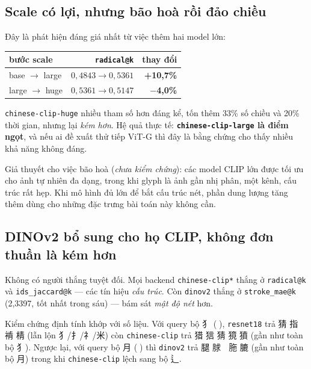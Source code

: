 \documentclass[11pt,a4paper]{article}
\newcommand{\nom}[1]{{\nomfont #1}}
\newcommand{\nomb}[1]{{\nomfontb #1}}
\newcommand{\code}[1]{\texttt{#1}}
\begin{document}
\subsection{Scale có lợi, nhưng bão hoà rồi đảo chiều}

Đây là phát hiện đáng giá nhất từ việc thêm hai model lớn:

\begin{center}
\begin{tabular}{lrr}
\toprule
bước scale & \code{radical@k} & thay đổi \\
\midrule
base $\to$ large & $0{,}4843 \to 0{,}5361$ & \textbf{+10,7\%} \\
large $\to$ huge & $0{,}5361 \to 0{,}5147$ & \textbf{$-$4,0\%} \\
\bottomrule
\end{tabular}
\end{center}

\code{chinese-clip-huge} nhiều tham số hơn đáng kể, tốn thêm 33\% số chiều và 20\% thời gian,
nhưng lại \emph{kém hơn}. Hệ quả thực tế: \textbf{\code{chinese-clip-large} là điểm ngọt}, và nếu
ai đề xuất thử tiếp ViT-G thì đây là bằng chứng cho thấy nhiều khả năng không đáng.

Giả thuyết cho việc bão hoà (\emph{chưa kiểm chứng}): các model CLIP lớn được tối ưu cho ảnh tự
nhiên đa dạng, trong khi glyph là ảnh gần nhị phân, một kênh, cấu trúc rất hẹp. Khi mô hình đủ lớn
để bắt cấu trúc nét, phần dung lượng tăng thêm dùng cho những đặc trưng bài toán này không cần.

\subsection{DINOv2 bổ sung cho họ CLIP, không đơn thuần là kém hơn}

Không có người thắng tuyệt đối. Mọi backend \code{chinese-clip*} thắng ở \code{radical@k} và
\code{ids\_jaccard@k} --- các tín hiệu \emph{cấu trúc}. Còn \code{dinov2} thắng ở
\code{stroke\_mae@k} (2,3397, tốt nhất trong sáu) --- bám sát \emph{mật độ nét} hơn.

Kiểm chứng định tính khớp với số liệu. Với query bộ \nom{犭} (\nomb{𤟂}), \code{resnet18} trả
\nom{猜 指 𢯡 褃 棈} (lẫn lộn \nom{犭/扌/礻/米}) còn \code{chinese-clip} trả \nom{猎 狺 猜 獍 獖}
(gần như toàn bộ \nom{犭}). Ngược lại, với query bộ \nom{月} (\nomb{𦝊}) thì \code{dinov2} trả
\nom{腿 脙}\nomb{ 𦟂 }\nom{胣 膔} (gần như toàn bộ \nom{月}) trong khi \code{chinese-clip} lệch sang bộ \nom{辶}.
\end{document}
